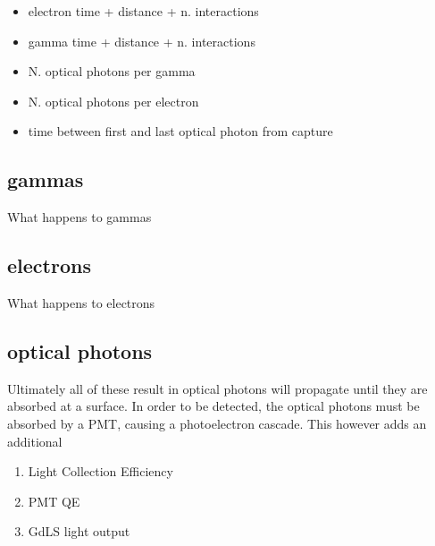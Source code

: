 \begin{itemize}
    \item electron time + distance + n. interactions
    \item gamma time + distance + n. interactions
    \item N. optical photons per gamma
    \item N. optical photons per electron
    \item time between first and last optical photon from capture
\end{itemize}

\subsection{gammas}
\par
What happens to gammas



\subsection{electrons}
\par
What happens to electrons


\subsection{optical photons}
\par
Ultimately all of these result in optical photons will propagate until they are absorbed at a surface.
In order to be detected, the optical photons must be absorbed by a PMT, causing a photoelectron cascade.
This however adds an additional 

\begin{tcolorbox}[colback=red!5!white, colframe=red!50!black, title=Key Plots]
\begin{enumerate}
    \item Light Collection Efficiency
    \item PMT QE
    \item GdLS light output
\end{enumerate}
\end{tcolorbox}


